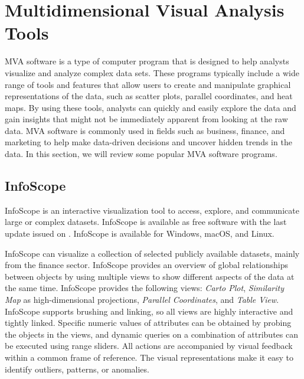 
\chapter{Multidimensional Visual Analysis Tools}

\label{chap:MVATools}

MVA software is a type of computer program that is designed to help
analysts visualize and analyze complex data sets. These programs
typically include a wide range of tools and features that allow users
to create and manipulate graphical representations of the data, such
as scatter plots, parallel coordinates, and heat maps. By using these
tools, analysts can quickly and easily explore the data and gain
insights that might not be immediately apparent from looking at the
raw data. MVA software is commonly used in fields such as business,
finance, and marketing to help make data-driven decisions and uncover
hidden trends in the data. In this section, we will review some
popular MVA software programs.




\section{InfoScope}

InfoScope \parencite{InfoScope} is an interactive visualization tool
to access, explore, and communicate large or complex
datasets. InfoScope is available as free software with the last update
issued on . InfoScope is available for Windows, 
macOS, and Linux.

InfoScope can visualize a collection of selected publicly available
datasets, mainly from the finance sector. InfoScope provides an
overview of global relationships between objects by using multiple
views to show different aspects of the data at the same
time. InfoScope provides the following views: \emph{Carto Plot},
\emph{Similarity Map} as high-dimensional projections, \emph{Parallel
Coordinates}, and \emph{Table View}. InfoScope supports brushing and
linking, so all views are highly interactive and tightly
linked. Specific numeric values of attributes can be obtained by
probing the objects in the views, and dynamic queries on a combination
of attributes can be executed using range sliders. All actions are
accompanied by visual feedback within a common frame of reference. The
visual representations make it easy to identify outliers, patterns, or
anomalies.



